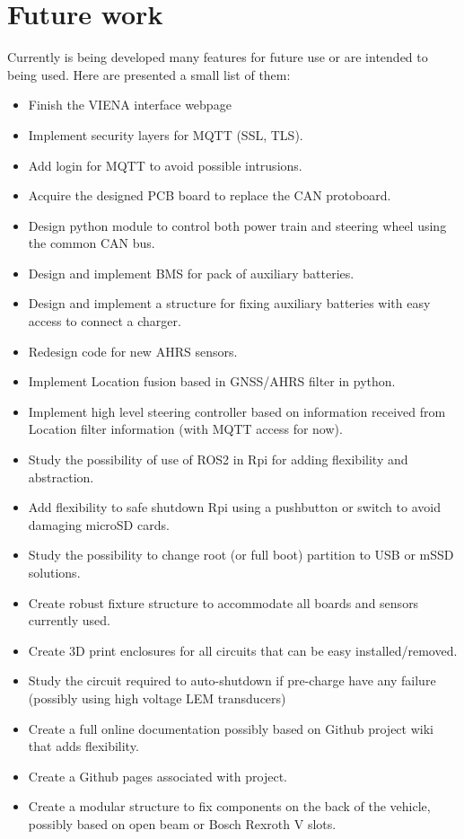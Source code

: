 \chapter{Future work}

Currently is being developed many features for future use or are intended to being used. Here are presented a small list of them:
\begin{itemize}
    \tightlist
    \item Finish the VIENA interface webpage
    \item Implement security layers for MQTT (SSL, TLS).
    \item Add login for MQTT to avoid possible intrusions.
    \item Acquire the designed \gls{PCB} board to replace the CAN protoboard.
    \item Design python module to control both power train and steering wheel  using the common CAN bus.
    \item Design and implement \gls{BMS} for pack of auxiliary batteries.
    \item Design and implement a structure for fixing auxiliary batteries with easy access to connect a charger.
    \item Redesign code for new \gls{AHRS} sensors.
    \item Implement Location fusion based in \gls{GNSS}/\gls{AHRS} filter in python.
    \item Implement high level steering controller based on information received from Location filter information (with \gls{MQTT} access for now).
    \item Study the possibility of use of ROS2 in \gls{Rpi} for adding flexibility and abstraction.
    \item Add flexibility to safe shutdown \gls{Rpi} using a pushbutton or switch to avoid damaging microSD cards.
    \item Study the possibility to change root (or full boot) partition to USB or mSSD solutions.
    \item Create robust fixture structure to accommodate all boards and sensors currently used.
    \item Create 3D print enclosures for all circuits that can be easy installed/removed.
    \item Study the circuit required to auto-shutdown if pre-charge have any failure (possibly using high voltage LEM transducers)
    \item Create a full online documentation possibly based on Github project wiki that adds flexibility.
    \item Create a Github pages associated with project.
    \item Create a modular structure to fix components on the back of the vehicle, possibly based on open beam or Bosch Rexroth V slots.
\end{itemize}